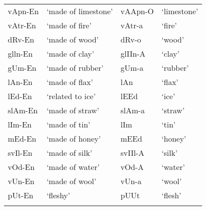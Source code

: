 \documentclass[output=paper]{langsci/langscibook}
\begin{document}
\begin{table}
\begin{tabular}{ l l l l}
\\  vApn-En & `made of limestone' & vAApn-O & `limestone' 
\\  vAtr-En & `made of fire' & vAtr-a & `fire' 
\\  dRv-En & `made of wood' & dRv-o & `wood'
\\  glln-En & `made of clay' & glIIn-A & `clay' 
\\  gUm-En & `made of rubber' & gUm-a & `rubber' 
\\  lAn-En & `made of flax' & lAn & `flax' 
\\  lEd-En & `related to ice' & lEEd & `ice' 
\\  slAm-En & `made of straw' & slAm-a & `straw' 
\\  lIm-En & `made of tin' & lIm & `tin' 
\\  mEd-En & `made of honey' & mEEd & `honey' 
\\  svIl-En & `made of silk' & svIIl-A & `silk' 
\\  vOd-En & `made of water' & vOd-A & `water' 
\\  vUn-En & `made of wool' & vUn-a & `wool' 
\\  pUt-En & `fleshy' & pUUt & `flesh' 
\\ 
 \lspbottomrule
 \end{tabular}
\end{table} 
\end{document}
